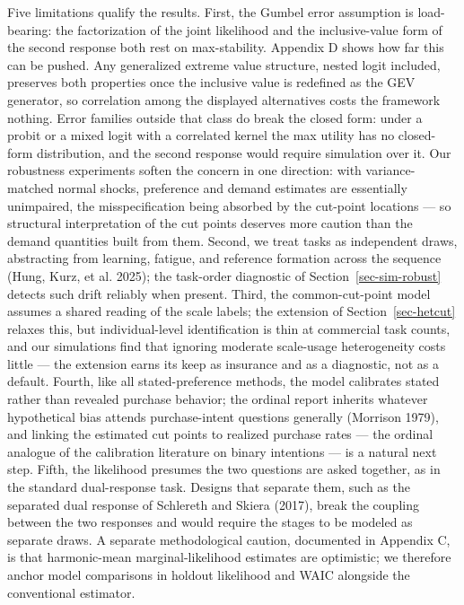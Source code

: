 \documentclass[
  letterpaper,
  DIV=11,
  numbers=noendperiod]{scrartcl}
\theoremstyle{plain}
\theoremstyle{plain}
\theoremstyle{remark}
\begin{document}
Five limitations qualify the results. First, the Gumbel error assumption
is load-bearing: the factorization of the joint likelihood and the
inclusive-value form of the second response both rest on max-stability.
Appendix D shows how far this can be pushed. Any generalized extreme
value structure, nested logit included, preserves both properties once
the inclusive value is redefined as the GEV generator, so correlation
among the displayed alternatives costs the framework nothing. Error
families outside that class do break the closed form: under a probit or
a mixed logit with a correlated kernel the max utility has no
closed-form distribution, and the second response would require
simulation over it. Our robustness experiments soften the concern in one
direction: with variance-matched normal shocks, preference and demand
estimates are essentially unimpaired, the misspecification being
absorbed by the cut-point locations --- so structural interpretation of
the cut points deserves more caution than the demand quantities built
from them. Second, we treat tasks as independent draws, abstracting from
learning, fatigue, and reference formation across the sequence (Hung,
Kurz, et al. 2025); the task-order diagnostic of
Section~\ref{sec-sim-robust} detects such drift reliably when present.
Third, the common-cut-point model assumes a shared reading of the scale
labels; the extension of Section~\ref{sec-hetcut} relaxes this, but
individual-level identification is thin at commercial task counts, and
our simulations find that ignoring moderate scale-usage heterogeneity
costs little --- the extension earns its keep as insurance and as a
diagnostic, not as a default. Fourth, like all stated-preference
methods, the model calibrates stated rather than revealed purchase
behavior; the ordinal report inherits whatever hypothetical bias attends
purchase-intent questions generally (Morrison 1979), and linking the
estimated cut points to realized purchase rates --- the ordinal analogue
of the calibration literature on binary intentions --- is a natural next
step. Fifth, the likelihood presumes the two questions are asked
together, as in the standard dual-response task. Designs that separate
them, such as the separated dual response of Schlereth and Skiera
(2017), break the coupling between the two responses and would require
the stages to be modeled as separate draws. A separate methodological
caution, documented in Appendix C, is that harmonic-mean
marginal-likelihood estimates are optimistic; we therefore anchor model
comparisons in holdout likelihood and WAIC alongside the conventional
estimator.
\end{document}
